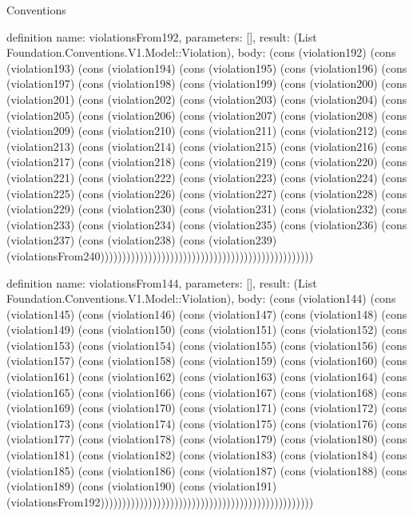 \begin{lexlean}{Conventions}
\begin{semanticmodule}
definition{
  name: violationsFrom192,
  parameters: [],
  result: (List Foundation.Conventions.V1.Model::Violation),
  body: (cons (violation192) (cons (violation193) (cons (violation194) (cons (violation195) (cons (violation196) (cons (violation197) (cons (violation198) (cons (violation199) (cons (violation200) (cons (violation201) (cons (violation202) (cons (violation203) (cons (violation204) (cons (violation205) (cons (violation206) (cons (violation207) (cons (violation208) (cons (violation209) (cons (violation210) (cons (violation211) (cons (violation212) (cons (violation213) (cons (violation214) (cons (violation215) (cons (violation216) (cons (violation217) (cons (violation218) (cons (violation219) (cons (violation220) (cons (violation221) (cons (violation222) (cons (violation223) (cons (violation224) (cons (violation225) (cons (violation226) (cons (violation227) (cons (violation228) (cons (violation229) (cons (violation230) (cons (violation231) (cons (violation232) (cons (violation233) (cons (violation234) (cons (violation235) (cons (violation236) (cons (violation237) (cons (violation238) (cons (violation239) (violationsFrom240)))))))))))))))))))))))))))))))))))))))))))))))))
}

definition{
  name: violationsFrom144,
  parameters: [],
  result: (List Foundation.Conventions.V1.Model::Violation),
  body: (cons (violation144) (cons (violation145) (cons (violation146) (cons (violation147) (cons (violation148) (cons (violation149) (cons (violation150) (cons (violation151) (cons (violation152) (cons (violation153) (cons (violation154) (cons (violation155) (cons (violation156) (cons (violation157) (cons (violation158) (cons (violation159) (cons (violation160) (cons (violation161) (cons (violation162) (cons (violation163) (cons (violation164) (cons (violation165) (cons (violation166) (cons (violation167) (cons (violation168) (cons (violation169) (cons (violation170) (cons (violation171) (cons (violation172) (cons (violation173) (cons (violation174) (cons (violation175) (cons (violation176) (cons (violation177) (cons (violation178) (cons (violation179) (cons (violation180) (cons (violation181) (cons (violation182) (cons (violation183) (cons (violation184) (cons (violation185) (cons (violation186) (cons (violation187) (cons (violation188) (cons (violation189) (cons (violation190) (cons (violation191) (violationsFrom192)))))))))))))))))))))))))))))))))))))))))))))))))
}


\end{semanticmodule}
\end{lexlean}
